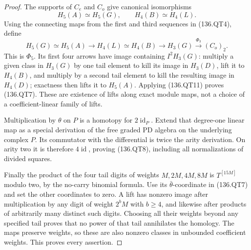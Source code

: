 \begin{proof}
The supports of \(C_e\) and \(C_o\) give canonical
isomorphisms
\[
                      H_5(A)\simeq H_5(G),\qquad
                      H_4(B)\simeq H_4(L).
\]
Using the connecting maps from the first and third sequences
in (136.QT4), define
\[
 H_5(G)\simeq H_5(A)\longrightarrow H_4(L)
       \simeq H_4(B)\longrightarrow H_3(G)
                            \xrightarrow{\Phi_3}(C_o)_2.
                                                               \tag{136.QT12}
\]
This is \(\Phi_5\).  Its first four arrows have image
containing \(I^2H_3(G)\): multiply a given class in \(H_3(G)\)
by one tail element to kill its image in \(H_3(D)\), lift
it to \(H_4(B)\), and multiply by a second tail element to
kill the resulting image in \(H_4(D)\); exactness then lifts
it to \(H_5(A)\).  Applying (136.QT11) proves (136.QT7).
These are existence of lifts along exact module maps, not a
choice of a coefficient-linear family of lifts.

Multiplication by \(\theta\) on \(P\) is a homotopy for
\(2\operatorname{id}_P\).  Extend that degree-one linear map
as a special derivation of the free graded PD algebra on the
underlying complex \(P\).  Its commutator with the differential
is twice the arity derivation.  On arity two it is therefore
\(4\operatorname{id}\), proving (136.QT8), including all
normalizations of divided squares.

Finally the product of the four tail digits of weights
\(M,2M,4M,8M\) is \(T^{[15M]}\) modulo two, by the
no-carry binomial formula.  Use its \(\bar\theta\)-coordinate
in (136.QT7) and set the other coordinates to zero.  A lift
has nonzero image after multiplication by any digit of weight
\(2^bM\) with \(b\geq4\), and likewise after products of
arbitrarily many distinct such digits.  Choosing all their
weights beyond any specified tail proves that no power of
that tail annihilates the homology.  The maps preserve weights,
so these are also nonzero classes in unbounded coefficient
weights.  This proves every assertion.
\end{proof}

